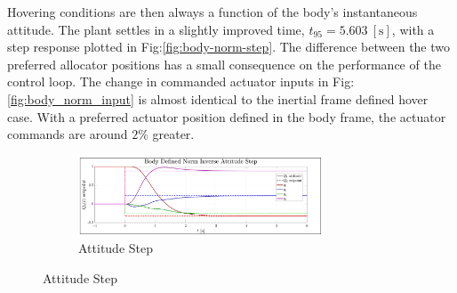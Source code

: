 Hovering conditions are then always a function of the body's instantaneous attitude. The plant settles in a slightly improved time, $t_{95}=5.603~[\text{s}]$, with a step response plotted in Fig:\ref{fig:body-norm-step}. The difference between the two preferred allocator positions has a small consequence on the performance of the control loop. The change in commanded actuator inputs in Fig:\ref{fig:body_norm_input} is almost identical to the inertial frame defined hover case. With a preferred actuator position defined in the body frame, the actuator commands are around $2\%$ greater.
\begin{figure}[hbtp]
\vspace{-6pt}
\centering
\begin{subfigure}{\textwidth}
\centering
\includegraphics[width=0.8\textwidth]{graphs/body_norm_attitude}
\vspace{-4pt}
\caption{Attitude Step}
\label{fig:body_norm_attitude}
\end{subfigure}
\vspace{-12pt}
\end{figure}
\newpage
